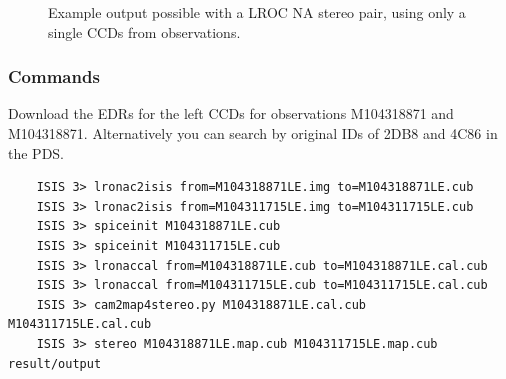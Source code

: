 \begin{figure}[h!]
\centering
  \hfil
\caption{Example output possible with a LROC NA stereo pair, using only a single CCDs from observations.}
\label{fig:lroc-na-example}
\end{figure}

\subsubsection*{Commands}

Download the EDRs for the left CCDs for observations M104318871 and
M104318871. Alternatively you can search by original IDs of 2DB8 and
4C86 in the PDS.

\begin{verbatim}
    ISIS 3> lronac2isis from=M104318871LE.img to=M104318871LE.cub
    ISIS 3> lronac2isis from=M104311715LE.img to=M104311715LE.cub
    ISIS 3> spiceinit M104318871LE.cub
    ISIS 3> spiceinit M104311715LE.cub
    ISIS 3> lronaccal from=M104318871LE.cub to=M104318871LE.cal.cub
    ISIS 3> lronaccal from=M104311715LE.cub to=M104311715LE.cal.cub
    ISIS 3> cam2map4stereo.py M104318871LE.cal.cub M104311715LE.cal.cub
    ISIS 3> stereo M104318871LE.map.cub M104311715LE.map.cub result/output
\end{verbatim}


